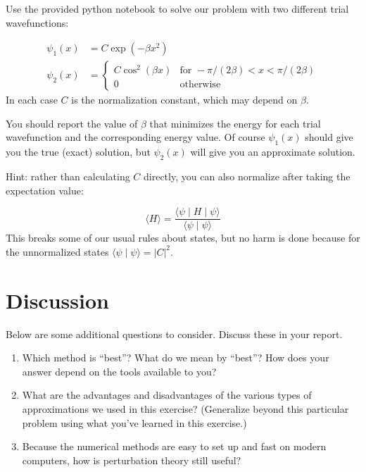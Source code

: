 \documentclass[fontsize=11pt,paper=letter,twoside=false,onecolumn]{article} %
\begin{document}
Use the provided python notebook to solve our problem with two different trial wavefunctions:

$$
\begin{aligned}
\psi_1(x) &= C \exp(-\beta x^2) \\
\psi_2(x) &= \begin{cases}
C \cos^2(\beta x) & \text{for }-\pi/(2\beta) < x < \pi/(2\beta) \\
0 & \text{otherwise}
\end{cases} 
\end{aligned}
$$
In each case $C$ is the normalization constant, which may depend on $\beta$.

You should report the value of $\beta$ that minimizes the energy for each trial wavefunction and the corresponding energy value.
Of course $\psi_1(x)$ should give you the true (exact) solution, but $\psi_2(x)$ will give you an approximate solution.

Hint: rather than calculating $C$ directly, you can also normalize after taking the expectation value:

$$
\langle H \rangle = \frac{\langle \psi \mid H \mid \psi \rangle}{\langle \psi \mid \psi \rangle}
$$
This breaks some of our usual rules about states, but no harm is done because for the unnormalized states $\langle \psi \mid \psi \rangle = |C|^2$.

\section{Discussion}
Below are some additional questions to consider.  Discuss these in your report.
\begin{enumerate}
\item Which method is ``best''?  What do we mean by ``best''?  How does your answer depend on the tools available to you?
\item What are the advantages and disadvantages of the various types of approximations we used in this exercise?  (Generalize beyond this particular problem using what you've learned in this exercise.)
\item Because the numerical methods are easy to set up and fast on modern computers, how is perturbation theory still useful?
\end{enumerate}
\end{document}
